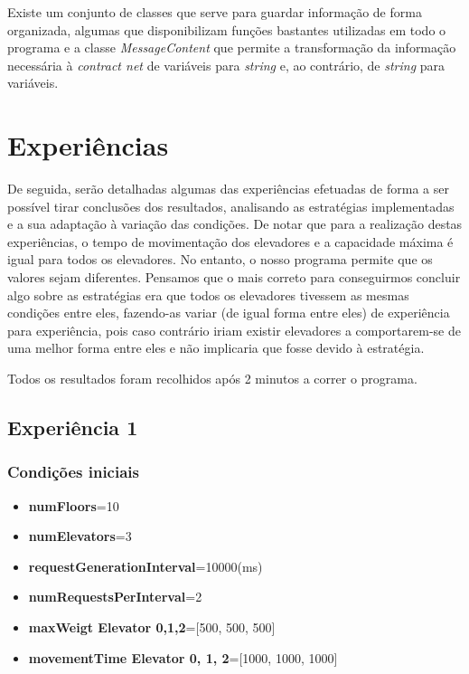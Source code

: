 \documentclass[a4paper]{article}
\begin{document}
Existe um conjunto de classes que serve para guardar informação de forma organizada, algumas que disponibilizam funções bastantes utilizadas em todo o programa e a classe \textit{MessageContent} que permite a transformação da informação necessária à \textit{contract net} de variáveis para \textit{string} e, ao contrário, de \textit{string} para variáveis.

\newpage

\section{Experiências}

De seguida, serão detalhadas algumas das experiências efetuadas de forma a ser possível tirar conclusões dos resultados, analisando as estratégias implementadas e a sua adaptação à variação das condições. De notar que para a realização destas experiências, o tempo de movimentação dos elevadores e a capacidade máxima é igual para todos os elevadores. No entanto, o nosso programa permite que os valores sejam diferentes. Pensamos que o mais correto para conseguirmos concluir algo sobre as estratégias era que todos os elevadores tivessem as mesmas condições entre eles, fazendo-as variar (de igual forma entre eles) de experiência para experiência, pois caso contrário iriam existir elevadores a comportarem-se de uma melhor forma entre eles e não implicaria que fosse devido à estratégia.

Todos os resultados foram recolhidos após 2 minutos a correr o programa.

\subsection{Experiência 1}

\subsubsection{Condições iniciais}

\begin{itemize}
\item \textbf{numFloors}=10
\item \textbf{numElevators}=3
\item \textbf{requestGenerationInterval}=10000(ms)
\item \textbf{numRequestsPerInterval}=2
\item \textbf{maxWeigt Elevator 0,1,2}=[500, 500, 500]
\item \textbf{movementTime Elevator 0, 1, 2}=[1000, 1000, 1000]
\end{itemize}
\end{document}
